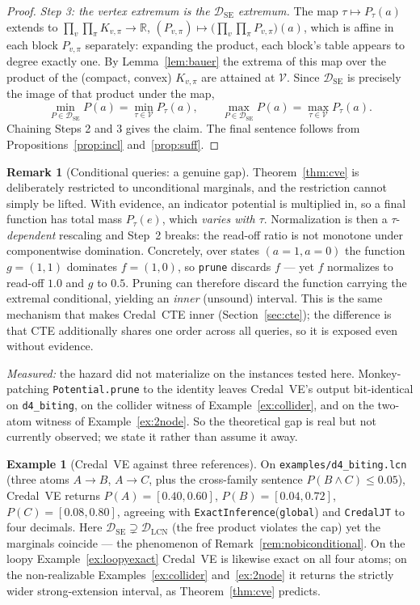 \documentclass[11pt]{article}
\theoremstyle{definition}
\newtheorem{example}{Example}
\newtheorem{remark}{Remark}
\newcommand{\DSE}{\mathcal{D}_{\mathrm{SE}}}
\newcommand{\DLCN}{\mathcal{D}_{\mathrm{LCN}}}
\begin{document}
\begin{proof}
\emph{Step 3: the vertex extremum is the $\DSE$ extremum.} The map
$\tau\mapsto P_\tau(a)$ extends to $\prod_v\prod_\pi K_{v,\pi}\to\mathbb R$,
$(P_{v,\pi})\mapsto\bigl(\prod_v\prod_\pi P_{v,\pi}\bigr)(a)$, which is affine in each block
$P_{v,\pi}$ separately: expanding the product, each block's table appears to degree exactly one. By
Lemma~\ref{lem:bauer} the extrema of this map over the product of the (compact, convex) $K_{v,\pi}$
are attained at $\mathcal V$. Since $\DSE$ is precisely the image of that product under the map,
\[
  \min_{P\in\DSE}P(a)=\min_{\tau\in\mathcal V}P_\tau(a),\qquad
  \max_{P\in\DSE}P(a)=\max_{\tau\in\mathcal V}P_\tau(a).
\]
Chaining Steps 2 and 3 gives the claim. The final sentence follows from
Propositions~\ref{prop:incl} and~\ref{prop:suff}.
\end{proof}

\begin{remark}[Conditional queries: a genuine gap]\label{rem:cvecond}
Theorem~\ref{thm:cve} is deliberately restricted to unconditional marginals, and the restriction
cannot simply be lifted. With evidence, an indicator potential is multiplied in, so a final function
has total mass $P_\tau(e)$, which \emph{varies with $\tau$}. Normalization is then a
$\tau$-\emph{dependent} rescaling and Step~2 breaks: the read-off ratio is not monotone under
componentwise domination. Concretely, over states $(a{=}1,a{=}0)$ the function $g=(1,1)$ dominates
$f=(1,0)$, so \texttt{prune} discards $f$ --- yet $f$ normalizes to read-off $1.0$ and $g$ to $0.5$.
Pruning can therefore discard the function carrying the extremal conditional, yielding an
\emph{inner} (unsound) interval. This is the same mechanism that makes Credal~CTE inner
(Section~\ref{sec:cte}); the difference is that CTE additionally shares one order across all queries,
so it is exposed even without evidence.

\emph{Measured:} the hazard did not materialize on the instances tested here. Monkey-patching
\texttt{Potential.prune} to the identity leaves Credal~VE's output bit-identical on
\texttt{d4\_biting}, on the collider witness of Example~\ref{ex:collider}, and on the two-atom
witness of Example~\ref{ex:2node}. So the theoretical gap is real but not currently observed; we
state it rather than assume it away.
\end{remark}

\begin{example}[Credal~VE against three references]\label{ex:cveex}
On \texttt{examples/d4\_biting.lcn} (three atoms $A\to B$, $A\to C$, plus the cross-family sentence
$P(B\wedge C)\le0.05$), Credal~VE returns $P(A)=[0.40,0.60]$, $P(B)=[0.04,0.72]$,
$P(C)=[0.08,0.80]$, agreeing with \texttt{ExactInference}(\texttt{global}) and \texttt{CredalJT} to
four decimals. Here $\DSE\supsetneq\DLCN$ (the free product violates the cap) yet the marginals
coincide --- the phenomenon of Remark~\ref{rem:nobiconditional}. On the loopy
Example~\ref{ex:loopyexact} Credal~VE is likewise exact on all four atoms; on the non-realizable
Examples~\ref{ex:collider} and~\ref{ex:2node} it returns the strictly wider strong-extension
interval, as Theorem~\ref{thm:cve} predicts.
\end{example}
\end{document}
